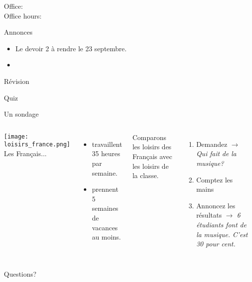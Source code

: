 \documentclass{beamer}
\subtitle[Nos loisirs (encore)]{Nos loisirs (encore)}
\begin{document}
  \begin{frame}
    \titlepage
    \tiny{Office: \\
          Office hours: }
  \end{frame}

  \begin{frame}{Annonces}
    \begin{itemize}
      \item Le devoir 2 à rendre le 23 septembre.
      \item[] 
    \end{itemize}
  \end{frame}

  \begin{frame}{Révision}
    \begin{center}
      
    \end{center}
  \end{frame}

  \begin{frame}{}
    \begin{center}
      \Large Quiz
    \end{center}
  \end{frame}

  \begin{frame}{Un sondage}
    \begin{columns}
        \texttt{[image: loisirs\_france.png]} \\
        Les Français...
        \begin{itemize}
          \item travaillent 35 heures par semaine.
          \item prennent 5 semaines de vacances au moins.
        \end{itemize}
        Comparons les loisirs des Français avec les loisirs de la classe. \\
        \begin{enumerate}
          \item Demandez $\to$ \emph{Qui fait de la musique?}
          \item Comptez les mains
          \item Annoncez les résultats $\to$ \emph{6 étudiants font de la musique. C'est 30 pour cent.}
        \end{enumerate}
    \end{columns}
  \end{frame}

  \begin{frame}{}
    \begin{center}
      \Large Questions?
    \end{center}
  \end{frame}
\end{document}
